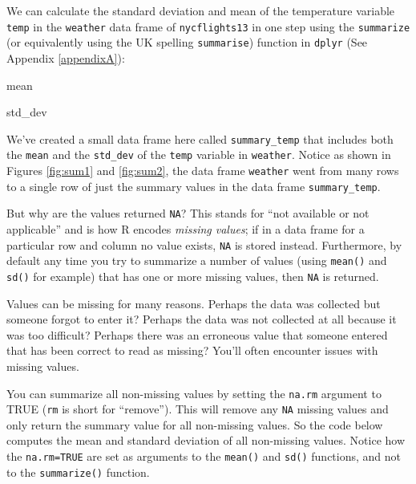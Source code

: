 \documentclass[12pt,]{krantz}
\makeatletter
\newenvironment{Shaded}{\begin{snugshade}}{\end{snugshade}}
\newcommand{\KeywordTok}[1]{\textcolor[rgb]{0.27,0.27,0.27}{\textbf{#1}}}
\newcommand{\DataTypeTok}[1]{\textcolor[rgb]{0.27,0.27,0.27}{#1}}
\newcommand{\StringTok}[1]{\textcolor[rgb]{0.5,0.5,0.5}{#1}}
\newcommand{\OperatorTok}[1]{\textcolor[rgb]{0.43,0.43,0.43}{\textbf{#1}}}
\newcommand{\NormalTok}[1]{#1}
\newenvironment{kframe}{%
\medskip{}
\setlength{\fboxsep}{.8em}
 \def\at@end@of@kframe{}%
 \ifinner\ifhmode%
  \def\at@end@of@kframe{\end{minipage}}%
  \begin{minipage}{\columnwidth}%
 \fi\fi%
 \def\FrameCommand##1{\hskip\@totalleftmargin \hskip-\fboxsep
 \colorbox{shadecolor}{##1}\hskip-\fboxsep
     \hskip-\linewidth \hskip-\@totalleftmargin \hskip\columnwidth}%
 \MakeFramed {\advance\hsize-\width
   \@totalleftmargin\z@ \linewidth\hsize
   \@setminipage}}%
 {\par\unskip\endMakeFramed%
 \at@end@of@kframe}
\renewenvironment{Shaded}{\begin{kframe}}{\end{kframe}}
\makeatother
\begin{document}
We can calculate the standard deviation and mean of the temperature
variable \texttt{temp} in the \texttt{weather} data frame of
\texttt{nycflights13} in one step using the \texttt{summarize} (or
equivalently using the UK spelling \texttt{summarise}) function in
\texttt{dplyr} (See Appendix \ref{appendixA}):

\begin{Shaded}
\end{Shaded}

mean

std\_dev

We've created a small data frame here called \texttt{summary\_temp} that
includes both the \texttt{mean} and the \texttt{std\_dev} of the
\texttt{temp} variable in \texttt{weather}. Notice as shown in Figures
\ref{fig:sum1} and \ref{fig:sum2}, the data frame \texttt{weather} went
from many rows to a single row of just the summary values in the data
frame \texttt{summary\_temp}.

But why are the values returned \texttt{NA}? This stands for ``not
available or not applicable'' and is how R encodes \emph{missing
values}; if in a data frame for a particular row and column no value
exists, \texttt{NA} is stored instead. Furthermore, by default any time
you try to summarize a number of values (using \texttt{mean()} and
\texttt{sd()} for example) that has one or more missing values, then
\texttt{NA} is returned.

Values can be missing for many reasons. Perhaps the data was collected
but someone forgot to enter it? Perhaps the data was not collected at
all because it was too difficult? Perhaps there was an erroneous value
that someone entered that has been correct to read as missing? You'll
often encounter issues with missing values.

You can summarize all non-missing values by setting the \texttt{na.rm}
argument to TRUE (\texttt{rm} is short for ``remove''). This will remove
any \texttt{NA} missing values and only return the summary value for all
non-missing values. So the code below computes the mean and standard
deviation of all non-missing values. Notice how the \texttt{na.rm=TRUE}
are set as arguments to the \texttt{mean()} and \texttt{sd()} functions,
and not to the \texttt{summarize()} function.
\end{document}
